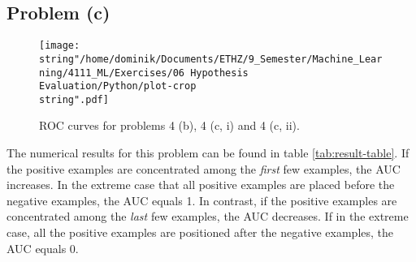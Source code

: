 \subsection*{Problem (c)}

\begin{figure}
\centering{}\texttt{[image: \\string"/home/dominik/Documents/ETHZ/9\_Semester/Machine\_Learning/4111\_ML/Exercises/06 Hypothesis Evaluation/Python/plot-crop\\string".pdf]}\caption{ROC curves for problems 4 (b), 4 (c, i) and 4 (c, ii).\label{fig:roc-curves} }
\end{figure}


The numerical results for this problem can be found in table \ref{tab:result-table}.
If the positive examples are concentrated among the \emph{first} few
examples, the AUC increases. In the extreme case that all positive
examples are placed before the negative examples, the AUC equals 1.
In contrast, if the positive examples are concentrated among the \emph{last}
few examples, the AUC decreases. If in the extreme case, all the positive
examples are positioned after the negative examples, the AUC equals
0.